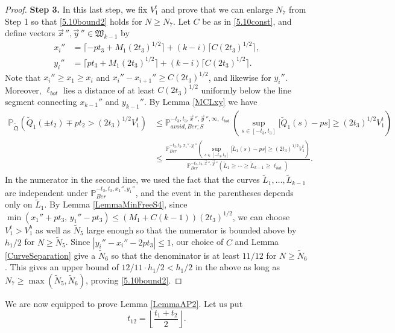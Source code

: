 \begin{proof}
	\noindent\textbf{Step 3.} In this last step, we fix $V_1^t$ and prove that we can enlarge $N_7$ from Step 1 so that \eqref{5.10bound2} holds for $N\geq N_7$. Let $C$ be as in \eqref{5.10const}, and define vectors $\vec{x}\,'', \vec{y}\,''\in\mathfrak{W}_{k-1}$ by
	\begin{align*}
	x_i'' &= \lceil -pt_3 + M_1(2t_3)^{1/2}\rceil + (k-i)\lceil C(2t_3)^{1/2}\rceil,\\
	y_i'' &= \lceil pt_3 + M_1(2t_3)^{1/2}\rceil + (k-i)\lceil C(2t_3)^{1/2}\rceil.
	\end{align*}
	Note that $x_i'' \geq x_1 \geq x_i$ and $x_i''-x_{i+1}'' \geq C(2t_3)^{1/2}$, and likewise for $y_i''$. Moreover, $\ell_{bot}$ lies a distance of at least $C(2t_3)^{1/2}$ uniformly below the line segment connecting $x_{k-1}''$ and $y_{k-1}''$. By Lemma \ref{MCLxy} we have
	\begin{align*}
	\mathbb{P}_{\tilde{\mathfrak{Q}}}\left(\tilde{Q}_1(\pm t_2) \mp pt_2 > (2t_3)^{1/2}V_1^t\right) &\leq \mathbb{P}^{-t_3,t_3,\vec{x}\,'',\vec{y}\,'',\infty,\ell_{bot}}_{avoid,Ber;S}\left(\sup_{s\in[-t_3,t_3]} \big[\tilde{Q}_1(s)-ps\big] \geq (2t_3)^{1/2}V_1^t\right)\\
	&\leq \frac{\mathbb{P}^{-t_3,t_3,x_1'',y_1''}_{Ber}\left(\sup_{s\in[-t_3,t_3]} \big[\tilde{L}_1(s)-ps\big] \geq (2t_3)^{1/2}V_1^t\right)}{\mathbb{P}^{-t_3,t_3,\vec{x}\,'',\vec{y}\,''}_{Ber}\left(\tilde{L}_1\geq\cdots\geq\tilde{L}_{k-1}\geq\ell_{bot}\right)}.
	\end{align*}
	In the numerator in the second line, we used the fact that the curves $\tilde{L}_1,\dots,\tilde{L}_{k-1}$ are independent under $\mathbb{P}^{-t_3,t_3,x_1'',y_1''}_{Ber}$, and the event in the parentheses depends only on $\tilde{L}_1$. By Lemma \ref{LemmaMinFreeS4}, since $\min(x_1'' + pt_3, \, y_1'' - pt_3) \leq (M_1+C(k-1))(2t_3)^{1/2}$, we can choose $V_1^t > V_1^b$ as well as $\tilde{N}_5$ large enough so that the numerator is bounded above by $h_1/2$ for $N\geq\tilde{N}_5$. Since $|y_i'' - x_i'' - 2pt_3| \leq 1$, our choice of $C$ and Lemma \ref{CurveSeparation} give a $\tilde{N}_6$ so that the denominator is at least $11/12$ for $N\geq\tilde{N}_6$. This gives an upper bound of $12/11\cdot h_1/2 < h_1/2$ in the above as long as $N_7\geq\max(\tilde{N}_5,\tilde{N}_6)$, proving \eqref{5.10bound2}.
	
	
\end{proof}

We are now equipped to prove Lemma \ref{LemmaAP2}. Let us put
\begin{equation}\label{t12}
t_{12} = \left\lfloor \frac{t_1+t_2}{2}\right\rfloor.
\end{equation}

